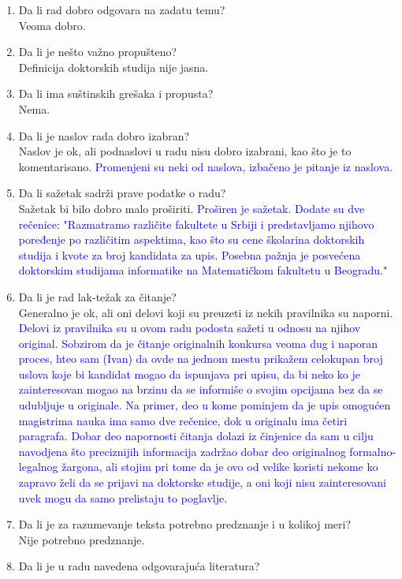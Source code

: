 \documentclass[a4paper]{report}
\newcommand{\odgovor}[1]{\textcolor{blue}{#1}}
\begin{document}
\begin{enumerate}
\item Da li rad dobro odgovara na zadatu temu?\\
Veoma dobro.
\item Da li je nešto važno propušteno?\\
Definicija doktorskih studija nije jasna.
\item Da li ima suštinskih grešaka i propusta?\\
Nema.
\item Da li je naslov rada dobro izabran?\\
Naslov je ok, ali podnaslovi u radu nisu dobro izabrani, kao što je to komentarisano. 
\odgovor{Promenjeni su neki od naslova, izbačeno je pitanje iz naslova.}
\item Da li sažetak sadrži prave podatke o radu?\\
Sažetak bi bilo dobro malo proširiti. 
\odgovor{Proširen je sažetak. Dodate su dve rečenice: "{}Razmatramo različite fakultete u Srbiji i predstavljamo njihovo poređenje po različitim aspektima, kao što su cene školarina doktorskih studija i kvote za broj kandidata za upis. Posebna pažnja je posvećena doktorskim studijama informatike na Matematičkom fakultetu u Beogradu."{}}
\item Da li je rad lak-težak za čitanje?\\
Generalno je ok, ali oni delovi koji su preuzeti iz nekih pravilnika su naporni. 
\odgovor{ Delovi iz pravilnika su u ovom radu podosta sažeti u odnosu na njihov original. Sobzirom da je čitanje originalnih konkursa veoma dug i naporan proces, hteo sam (Ivan) da ovde na jednom mestu prikažem celokupan broj uslova koje bi kandidat mogao da ispunjava pri upisu, da bi neko ko je zainteresovan mogao na brzinu da se informiše o svojim opcijama bez da se udubljuje u originale. Na primer, deo u kome pominjem da je upis omogućen magistrima nauka ima samo dve rečenice, dok u originalu ima četiri paragrafa. Dobar deo napornosti čitanja dolazi iz činjenice da sam u cilju navodjena što preciznijih informacija zadržao dobar deo originalnog formalno-legalnog žargona, ali stojim pri tome da je ovo od velike koristi nekome ko zapravo želi da se prijavi na doktorske studije, a oni koji nisu zainteresovani uvek mogu da samo prelistaju to poglavlje. }
\item Da li je za razumevanje teksta potrebno predznanje i u kolikoj meri?\\
Nije potrebno predznanje.
\item Da li je u radu navedena odgovarajuća literatura?\\

\end{enumerate}
\end{document}
